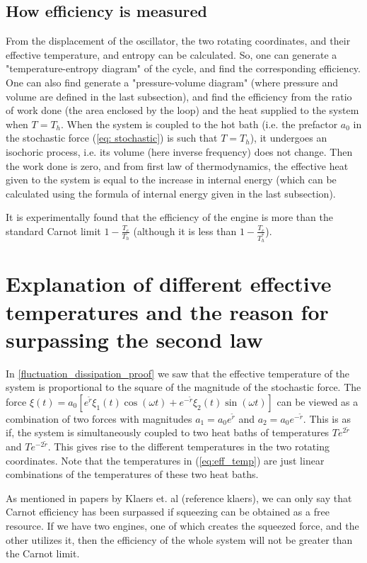\documentclass[12pt, twoside]{article}
\begin{document}
\subsection{How efficiency is measured}
From the displacement of the oscillator, the two rotating coordinates, and their effective temperature, and entropy can be calculated. So, one can generate a "temperature-entropy diagram" of the cycle, and find the corresponding efficiency. One can also find generate a "pressure-volume diagram" (where pressure and volume are defined in the last subsection), and find the efficiency from the ratio of work done (the area enclosed by the loop) and the heat supplied to the system when $T = T_h$. When the system is coupled to the hot bath (i.e. the prefactor $a_0$ in the stochastic force (\ref{eq: stochastic}) is such that $T = T_h$), it undergoes an isochoric process, i.e. its volume (here inverse frequency) does not change. Then the work done is zero, and from first law of thermodynamics, the effective heat given to the system is equal to the increase in internal energy (which can be calculated using the formula of internal energy given in the last subsection).

It is experimentally found that the efficiency of the engine is more than the standard Carnot limit $1 - \frac{T_c}{T_h}$ (although it is less than $1 - \frac{T_c}{T^* _h}$).

\section{Explanation of different effective temperatures and the reason for surpassing the second law}
In \ref{fluctuation_dissipation_proof} we saw that the effective temperature of the system is proportional to the square of the magnitude of the stochastic force. The force $\xi(t) =  a_0 [e^{\tilde{r}} \xi_1(t) \cos(\omega t) + e^{-{\tilde{r}}} \xi_2(t)\sin(\omega t)]$ can be viewed as a combination of two forces with magnitudes $a_1 = a_0 e^{\tilde{r}}$ and $a_2 = a_0 e^{-{\tilde{r}}}$. This is as if, the system is simultaneously coupled to two heat baths of temperatures $T e^{2{\tilde{r}}}$ and $T e^{-2{\tilde{r}}}$. This gives rise to the different temperatures in the two rotating coordinates. Note that the temperatures in (\ref{eq:eff_temp}) are just linear combinations of the temperatures of these two heat baths.

As mentioned in papers by Klaers et. al (reference klaers), we can only say that Carnot efficiency has been surpassed if squeezing can be obtained as a free resource. If we have two engines, one of which creates the squeezed force, and the other utilizes it, then the efficiency of the whole system will not be greater than the Carnot limit.
\end{document}
